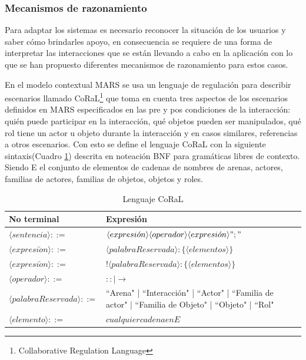 \subsubsection{Mecanismos de razonamiento}

Para adaptar los sistemas es necesario reconocer la situaci\'on de los usuarios y saber c\'omo brindarles apoyo, en consecuencia se requiere de una forma de interpretar las interacciones que se est\'an llevando a cabo en la aplicaci\'on con lo que se han propuesto diferentes mecanismos de razonamiento para estos casos.

En el modelo contextual MARS se usa un lenguaje de regulaci\'on para describir escenarios llamado CoRaL\footnote{Collaborative Regulation Language} que toma en cuenta tres aspectos de los escenarios definidos en MARS especificados en las pre y pos condiciones de la interacci\'on: qui\'en puede participar en la interacci\'on, qu\'e objetos pueden ser manipulados, qu\'e rol tiene un actor u objeto durante la interacci\'on y en casos similares, referencias a otros escenarios. Con esto se define el lenguaje CoRaL con la siguiente sintaxis(Cuadro \ref{lan:mars}) descrita en noteaci\'on BNF para gram\'aticas libres de contexto. Siendo E el conjunto de elementos de cadenas de nombres de arenas, actores, familias de actores, familias de objetos, objetos y roles. 

\begin{table}
\label{lan:mars}
\centering
\caption{Lenguaje CoRaL}
\begin{tabular}{|p{5cm}|p{8cm}|}
\hline \textbf{No terminal} & \textbf{Expresi\'on}\\
\hline $\langle sentencia \rangle ::=$ & $\langle expresi\acute{o}n \rangle \langle operador \rangle \langle expresi\acute{o}n \rangle";"$\\
\hline $\langle expresi\acute{o}n \rangle  ::=$ & $\langle palabraReservada \rangle :\{\langle elementos \rangle \}$\\
\hline
$\langle expresi\acute{o}n \rangle  ::=$ & $!\langle palabraReservada \rangle :\{\langle elementos \rangle \}$\\
\hline $\langle operador \rangle  ::=$ & $:: | \rightarrow$\\
\hline $\langle palabraReservada \rangle  ::=$ &  ``Arena" | ``Interacci\'on" | ``Actor" | ``Familia de actor" | ``Familia de Objeto" | ``Objeto" | ``Rol"\\
\hline $\langle elemento \rangle  ::=$ & $cualquier cadena en E$ \\
\hline
\end{tabular}
\end{table}

